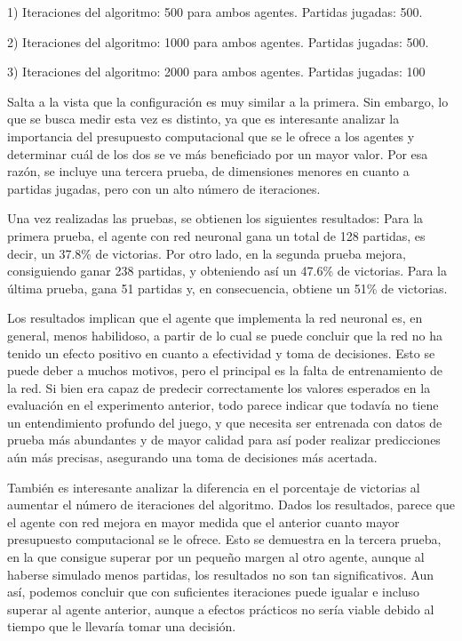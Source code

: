 \documentclass[conference,a4paper]{IEEEtran}
\begin{document}
1)	Iteraciones del algoritmo: 500 para ambos agentes. Partidas jugadas: 500.

2)	Iteraciones del algoritmo: 1000 para ambos agentes. Partidas jugadas: 500.

3)	Iteraciones del algoritmo: 2000 para ambos agentes. Partidas jugadas: 100

Salta a la vista que la configuración es muy similar a la primera. Sin embargo, lo que se busca medir esta vez es distinto, ya que es interesante 
analizar la importancia del presupuesto computacional que se le ofrece a los agentes y determinar cuál de los dos se ve más beneficiado por un mayor valor. 
Por esa razón, se incluye una tercera prueba, de dimensiones menores en cuanto a partidas jugadas, pero con un alto número de iteraciones.

Una vez realizadas las pruebas, se obtienen los siguientes resultados: Para la primera prueba, el agente con red neuronal gana un total de 128 partidas, 
es decir, un 37.8\% de victorias. Por otro lado, en la segunda prueba mejora, consiguiendo ganar 238 partidas, y obteniendo así un 47.6\% de victorias.
Para la última prueba, gana 51 partidas y, en consecuencia, obtiene un 51\% de victorias.

Los resultados implican que el agente que implementa la red neuronal es, en general, menos habilidoso, a partir de lo cual se puede concluir que 
la red no ha tenido un efecto positivo en cuanto a efectividad y toma de decisiones. Esto se puede deber a muchos motivos, pero el principal es 
la falta de entrenamiento de la red. Si bien era capaz de predecir correctamente los valores esperados en la evaluación en el experimento anterior, 
todo parece indicar que todavía no tiene un entendimiento profundo del juego, y que necesita ser entrenada con datos de prueba más abundantes y de 
mayor calidad para así poder realizar predicciones aún más precisas, asegurando una toma de decisiones más acertada. 

También es interesante analizar la diferencia en el porcentaje de victorias al aumentar el número de iteraciones del algoritmo. Dados los resultados, 
parece que el agente con red mejora en mayor medida que el anterior cuanto mayor presupuesto computacional se le ofrece. Esto se demuestra en la tercera 
prueba, en la que consigue superar por un pequeño margen al otro agente, aunque al haberse simulado menos partidas, los resultados no son tan significativos. 
Aun así, podemos concluir que con suficientes iteraciones puede igualar e incluso superar al agente anterior, aunque a efectos prácticos no sería viable 
debido al tiempo que le llevaría tomar una decisión.
\end{document}
